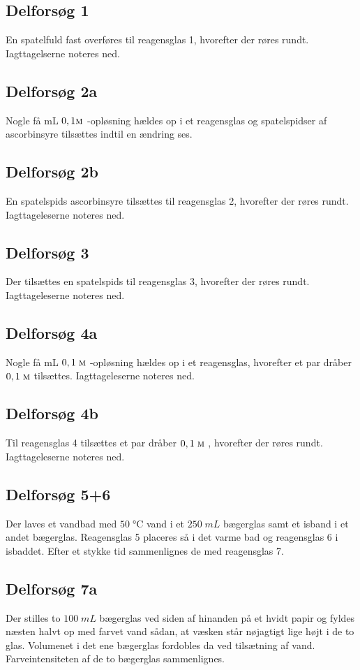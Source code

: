 \documentclass{report}
\begin{document}
\subsection*{Delforsøg 1}
En spatelfuld fast  overføres til reagensglas 1, hvorefter der røres rundt.
Iagttagelserne noteres ned.
\subsection*{Delforsøg 2a}
Nogle få \unit{mL} $0,1 \textsc{m}$ -opløsning hældes op i et reagensglas og spatelspidser af ascorbinsyre tilsættes indtil en ændring ses.
\subsection*{Delforsøg 2b}
En spatelspids ascorbinsyre tilsættes til reagensglas 2, hvorefter der røres rundt.
Iagttageleserne noteres ned.
\subsection*{Delforsøg 3}
Der tilsættes en spatelspids  til reagensglas 3, hvorefter der røres rundt.
Iagttageleserne noteres ned.
\subsection*{Delforsøg 4a}
Nogle få \unit{mL} $0,1 \;\unit{\textsc{m}} $ -opløsning hældes op i et reagensglas, hvorefter et par dråber $0,1 \;\unit{\textsc{m}} $  tilsættes.
Iagttageleserne noteres ned.
\subsection*{Delforsøg 4b}
Til reagensglas 4 tilsættes et par dråber $0,1 \;\unit{\textsc{m}} $ , hvorefter der røres rundt.
Iagttageleserne noteres ned.
\subsection*{Delforsøg 5+6}
Der laves et vandbad med $50 \;\unit{\celsius} $ vand i et $250 \;\unit{mL} $ bægerglas samt et isband i et andet bægerglas.
Reagensglas 5 placeres så i det varme bad og reagensglas 6 i isbaddet.
Efter et stykke tid sammenlignes de med reagensglas 7.
\subsection*{Delforsøg 7a}
Der stilles to $100 \;\unit{mL} $ bægerglas ved siden af hinanden på et hvidt papir og fyldes næsten halvt op med farvet vand sådan, at væsken står nøjagtigt lige højt i de to glas.
Volumenet i det ene bægerglas fordobles da ved tilsætning af vand.
Farveintensiteten af de to bægerglas sammenlignes.
\end{document}
